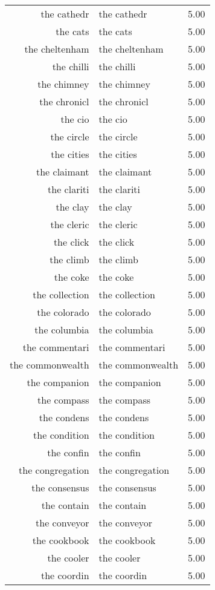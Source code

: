 \begin{table}[ht]
\begin{tabular}{rlr}
  the cathedr & the cathedr & 5.00 \\ 
  the cats & the cats & 5.00 \\ 
  the cheltenham & the cheltenham & 5.00 \\ 
  the chilli & the chilli & 5.00 \\ 
  the chimney & the chimney & 5.00 \\ 
  the chronicl & the chronicl & 5.00 \\ 
  the cio & the cio & 5.00 \\ 
  the circle & the circle & 5.00 \\ 
  the cities & the cities & 5.00 \\ 
  the claimant & the claimant & 5.00 \\ 
  the clariti & the clariti & 5.00 \\ 
  the clay & the clay & 5.00 \\ 
  the cleric & the cleric & 5.00 \\ 
  the click & the click & 5.00 \\ 
  the climb & the climb & 5.00 \\ 
  the coke & the coke & 5.00 \\ 
  the collection & the collection & 5.00 \\ 
  the colorado & the colorado & 5.00 \\ 
  the columbia & the columbia & 5.00 \\ 
  the commentari & the commentari & 5.00 \\ 
  the commonwealth & the commonwealth & 5.00 \\ 
  the companion & the companion & 5.00 \\ 
  the compass & the compass & 5.00 \\ 
  the condens & the condens & 5.00 \\ 
  the condition & the condition & 5.00 \\ 
  the confin & the confin & 5.00 \\ 
  the congregation & the congregation & 5.00 \\ 
  the consensus & the consensus & 5.00 \\ 
  the contain & the contain & 5.00 \\ 
  the conveyor & the conveyor & 5.00 \\ 
  the cookbook & the cookbook & 5.00 \\ 
  the cooler & the cooler & 5.00 \\ 
  the coordin & the coordin & 5.00 \\ 

\end{tabular}
\end{table}
